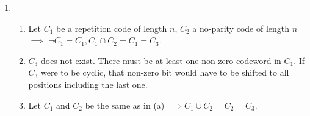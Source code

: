 \documentclass[a4paper,10pt]{extarticle}
\begin{document}
\begin{enumerate}
\begin{center}
\begin{tabular}{|c|c|}
        \hline
      \end{tabular}
    \end{center}
  \item
    \begin{enumerate}
      \item
        Let $C_1$ be a repetition code of length $n$, $C_2$ a no-parity code of length $n$ $\implies$ $\neg C_1=C_1, C_1\cap C_2=C_1=C_3$.
      \item
        $C_3$ does not exist. There must be at least one non-zero codeword in $C_1$. If $C_3$ were to be cyclic, that non-zero bit would have to be shifted to all positions including the last one.
      \item
        Let $C_1$ and $C_2$ be the same as in (a) $\implies C_1 \cup C_2=C_2=C_3$.
    \end{enumerate}
\end{enumerate}
\end{document}
